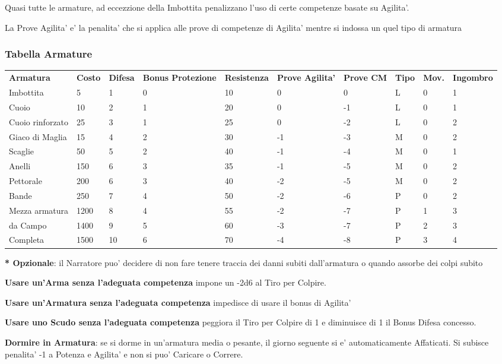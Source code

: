 \documentclass[a4paper,11pt,twoside,openany]{book}
\begin{document}
{Quasi tutte le armature, ad eccezzione della Imbottita penalizzano l'uso di certe competenze basate su Agilita'. 

La Prove Agilita' e' la penalita' che si applica alle prove di competenze di Agilita' mentre si indossa un quel tipo di armatura 

\subsubsection{Tabella Armature}
\medskip

\label{tabella-armature}
\begin{tabular}{L{2cm} L{1.2cm} L{1.3cm} L{2cm} L{1.3cm} L{1.5cm} L{1.5cm}L{1cm}L{1cm}L{2cm}} 
\toprule
\textbf{Armatura} &\textbf{Costo} & \textbf{Difesa} & \textbf{Bonus Protezione }& \textbf{Resistenza} & \textbf{Prove Agilita’} & \textbf{Prove CM} & \textbf{Tipo} & \textbf{Mov.} & \textbf{Ingombro}\tabularnewline
Imbottita & 5 & 1 & 0 & 10 & 0 & 0 & L & 0 & 1\tabularnewline
Cuoio & 10 & 2 & 1 & 20 & 0 & -1 & L & 0 & 1\tabularnewline
Cuoio rinforzato & 25 & 3 & 1 & 25 & 0 & -2 & L & 0 & 2\tabularnewline
Giaco di Maglia & 15 & 4 & 2 & 30 & -1 & -3 & M & 0 & 2\tabularnewline
Scaglie & 50 & 5 & 2 & 40 & -1 & -4 & M & 0 & 1\tabularnewline
Anelli & 150 & 6 & 3 & 35 & -1 & -5 & M & 0 & 2\tabularnewline
Pettorale & 200 & 6 & 3 & 40 & -2 & -5 & M & 0 & 2\tabularnewline
Bande & 250 & 7 & 4 & 50 & -2 & -6 & P & 0 & 2\tabularnewline
Mezza armatura & 1200 & 8 & 4 & 55 & -2 & -7 & P & 1 & 3\tabularnewline
da Campo & 1400 & 9 & 5 & 60 & -3 & -7 & P & 2 & 3\tabularnewline
Completa & 1500 & 10 & 6 & 70 & -4 & -8 & P & 3 & 4\tabularnewline
\end{tabular}

\textbf{{*} Opzionale}: il Narratore puo' decidere di non fare tenere traccia dei danni subiti dall'armatura o quando assorbe dei colpi subito

\bigskip

\textbf{Usare un'Arma senza l'adeguata competenza} impone un -2d6 al Tiro per Colpire.

\textbf{Usare un'Armatura senza l'adeguata competenza} impedisce di usare il bonus di Agilita'

\textbf{Usare uno Scudo senza l'adeguata competenza} peggiora il Tiro per Colpire di 1 e diminuisce di 1 il Bonus Difesa concesso.

\textbf{Dormire in Armatura}: se si dorme in un'armatura media o pesante, il giorno seguente si e' automaticamente Affaticati. Si subisce penalita' -1 a Potenza e Agilita' e non si puo' Caricare o Correre.

}
\end{document}
